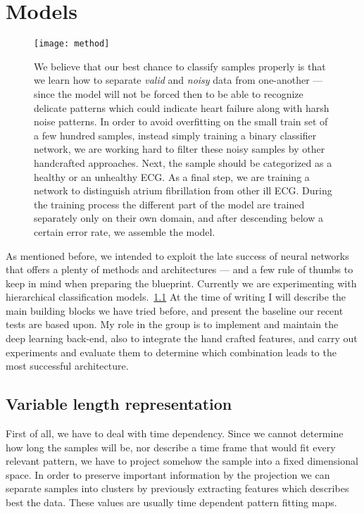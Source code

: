 \chapter{Models}
\begin{figure}[h]
  \centering
  \texttt{[image: method]}\label{fig:method}
  \caption{We believe that our best chance to classify samples properly is that we learn how to separate \textit{valid} and \textit{noisy} data from one-another --- since the model will not be forced then to be able to recognize delicate patterns which could indicate heart failure along with harsh noise patterns. In order to avoid overfitting on the small train set of a few hundred samples, instead simply training a binary classifier network, we are working hard to filter these noisy samples by other handcrafted approaches. Next, the sample should be categorized as a healthy or an unhealthy ECG. As a final step, we are training a network to distinguish atrium fibrillation from other ill ECG. During the training process the different part of the model are trained separately only on their own domain, and after descending below a certain error rate, we assemble the model.}
\end{figure}

As mentioned before, we intended to exploit the late success of neural networks that offers a plenty of methods and architectures --- and a few rule of thumbs to keep in mind when preparing the blueprint.
Currently we are experimenting with hierarchical classification models.~\ref{fig:method}
At the time of writing I will describe the main building blocks we have tried before, and present the baseline our recent tests are based upon.
My role in the group is to implement and maintain the deep learning back-end, also to integrate the hand crafted features, and carry out experiments and evaluate them to determine which combination leads to the most successful architecture.

\section{Variable length representation}
First of all, we have to deal with time dependency. Since we cannot determine how long the samples will be, nor describe a time frame that would fit every relevant pattern, we have to project somehow the sample into a fixed dimensional space. In order to preserve important information by the projection we can separate samples into clusters by previously extracting features which describes best the data. These values are usually time dependent pattern fitting maps.

